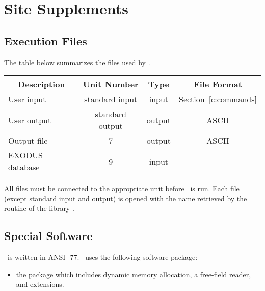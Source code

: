 \chapter{Site Supplements} \label{a:site}



\section{Execution Files} \label{exec:files}

The table below summarizes the files used by \numbers.

\begin{center} \begin{tabular}{||l|c|c|c||}
\hline
\multicolumn{1}{||c}{Description} &
\multicolumn{1}{|c}{Unit Number} &
\multicolumn{1}{|c}{Type} &
\multicolumn{1}{|c||}{File Format} \\
\hline
     User input & standard input  & input  & Section~\ref{c:commands} \\
    User output & standard output & output & ASCII \\
Output file     &               7 & output & ASCII \\
EXODUS database &               9 & input  & \\
\hline
\end{tabular} \end{center}

All files must be connected to the appropriate unit before
\numbers\ is run. Each file (except standard input and output) is
opened with the name retrieved by the  routine of the
 library \cite{supes}.

\section{Special Software}

\numbers\ is written in ANSI -77.
\numbers\ uses the following software package:
\setlength{\itemsep}{\medskipamount} \begin{itemize}
\item the  package \cite{supes} which includes dynamic
memory allocation, a free-field reader, and 
extensions.
\end{itemize}
